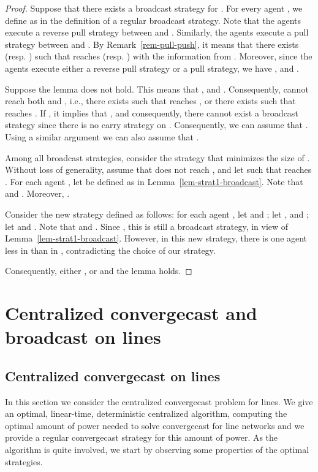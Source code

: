 \documentclass{article}
\newcommand\convergecast{convergecast\xspace}
\newcommand\broadcast{broadcast\xspace}
\newcommand\Cccast{Centralized convergecast\xspace}
\newcommand\subproblem{carry\xspace}
\begin{document}
\begin{proof}
Suppose that there exists a \broadcast strategy for
.  For every agent ,  we define  as in the definition of a regular broadcast strategy. Note that the agents 
execute a reverse pull strategy between  and
. Similarly, the agents  execute a
pull strategy between  and .  By
Remark~\ref{rem-pull-push}, it means that there exists 
(resp. ) such that  reaches  (resp. )
with the information from .  Moreover, since the agents execute either a reverse pull 
strategy or a pull strategy, we have , and .

Suppose the lemma does not hold. This means that , and . Consequently,
 cannot reach both  and , i.e., there exists  such that  reaches , or there exists  such
that  reaches . If , it implies
that , and consequently, there cannot exist a
{\broadcast} strategy since there is no \subproblem strategy on
. Consequently, we can assume that
. Using a similar argument we can also assume that . 



Among all {\broadcast} strategies, consider the strategy that
minimizes the size of . Without loss of generality, assume that 
does not reach , and let  such that  reaches
. For each agent , let  be defined as in
Lemma~\ref{lem-strat1-broadcast}. Note that  and
. Moreover, .

Consider the new strategy defined as follows: for each agent , let  and ; let ,  and ; let  and . Note that
 and .  Since
, this is still a {\broadcast} strategy, in view of
Lemma~\ref{lem-strat1-broadcast}. However, in this new strategy, there
is one agent less in  than in , contradicting the choice of our
strategy. 

Consequently, either , or  and the lemma holds. 
\end{proof}

\section{{\Cccast} and broadcast on lines}\label{s:line}

\subsection{{\Cccast} on lines}\label{s:line}

In this section we consider the centralized {\convergecast} problem
for lines. We give an optimal, linear-time, deterministic centralized
algorithm, computing the optimal amount of power needed to solve
{\convergecast} for line networks and we provide a regular convergecast strategy for this amount of power. As the algorithm is quite involved,
we start by observing some properties of the optimal
strategies. 
\end{document}
